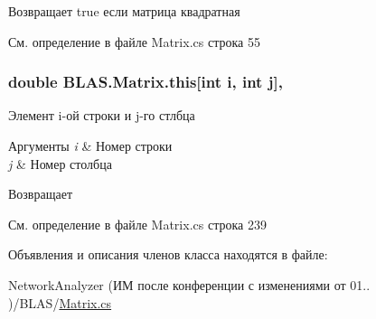 Возвращает true если матрица квадратная 



См. определение в файле Matrix.\+cs строка 55

\subsubsection[{\texorpdfstring{this[int i, int j]}{this[int i, int j]}}]{\setlength{\rightskip}{0pt plus 5cm}double B\+L\+A\+S.\+Matrix.\+this\mbox{[}int i, int j\mbox{]}\hspace{0.3cm}{\ttfamily [get]}, {\ttfamily [set]}}\hypertarget{class_b_l_a_s_1_1_matrix_add823747419052a25f9a5cf67c8eeb03}{}\label{class_b_l_a_s_1_1_matrix_add823747419052a25f9a5cf67c8eeb03}


Элемент i-\/ой строки и j-\/го стлбца 


\begin{DoxyParams}{Аргументы}
{\em i} & Номер строки\\
\hline
{\em j} & Номер столбца\\
\hline
\end{DoxyParams}
\begin{DoxyReturn}{Возвращает}

\end{DoxyReturn}


См. определение в файле Matrix.\+cs строка 239



Объявления и описания членов класса находятся в файле\+:\begin{DoxyCompactItemize}
\item 
Network\+Analyzer (ИМ после конференции  с изменениями от 01.. )/\+B\+L\+A\+S/\hyperlink{_matrix_8cs}{Matrix.\+cs}\end{DoxyCompactItemize}
